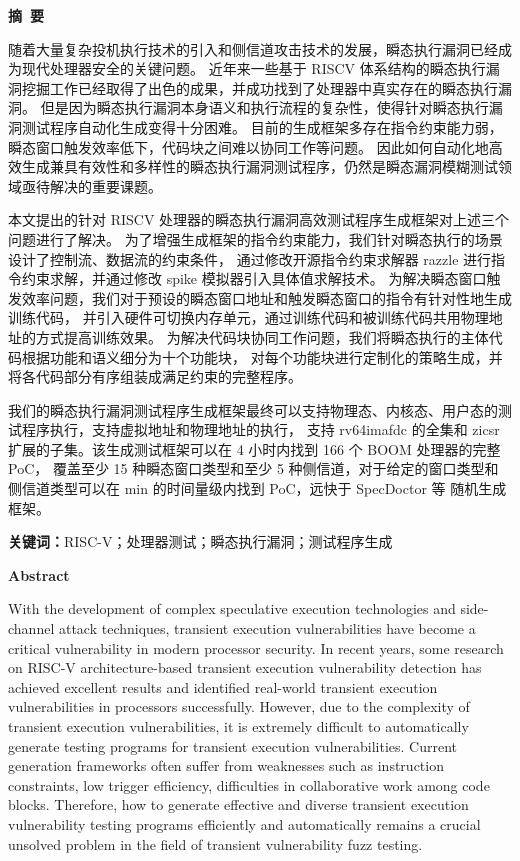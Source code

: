 \cleardoublepage{}
\begin{center}
    \bfseries {} 摘~要
\end{center}

随着大量复杂投机执行技术的引入和侧信道攻击技术的发展，瞬态执行漏洞已经成为现代处理器安全的关键问题。
近年来一些基于 RISCV 体系结构的瞬态执行漏洞挖掘工作已经取得了出色的成果，并成功找到了处理器中真实存在的瞬态执行漏洞。
但是因为瞬态执行漏洞本身语义和执行流程的复杂性，使得针对瞬态执行漏洞测试程序自动化生成变得十分困难。
目前的生成框架多存在指令约束能力弱，瞬态窗口触发效率低下，代码块之间难以协同工作等问题。
因此如何自动化地高效生成兼具有效性和多样性的瞬态执行漏洞测试程序，仍然是瞬态漏洞模糊测试领域亟待解决的重要课题。\par

本文提出的针对 RISCV 处理器的瞬态执行漏洞高效测试程序生成框架对上述三个问题进行了解决。
为了增强生成框架的指令约束能力，我们针对瞬态执行的场景设计了控制流、数据流的约束条件，
通过修改开源指令约束求解器 razzle 进行指令约束求解，并通过修改 spike 模拟器引入具体值求解技术。
为解决瞬态窗口触发效率问题，我们对于预设的瞬态窗口地址和触发瞬态窗口的指令有针对性地生成训练代码，
并引入硬件可切换内存单元，通过训练代码和被训练代码共用物理地址的方式提高训练效果。
为解决代码块协同工作问题，我们将瞬态执行的主体代码根据功能和语义细分为十个功能块，
对每个功能块进行定制化的策略生成，并将各代码部分有序组装成满足约束的完整程序。\par

我们的瞬态执行漏洞测试程序生成框架最终可以支持物理态、内核态、用户态的测试程序执行，支持虚拟地址和物理地址的执行，
支持 rv64imafdc 的全集和 zicsr 扩展的子集。该生成测试框架可以在 4 小时内找到 166 个 BOOM 处理器的完整 PoC，
覆盖至少 15 种瞬态窗口类型和至少 5 种侧信道，对于给定的窗口类型和侧信道类型可以在 min 的时间量级内找到 PoC，远快于 SpecDoctor 等
随机生成框架。\par

\textbf{关键词：}RISC-V；处理器测试；瞬态执行漏洞；测试程序生成

\cleardoublepage{}
\begin{center}
    \bfseries {} Abstract
\end{center}

With the development of complex speculative execution technologies 
and side-channel attack techniques, transient execution vulnerabilities have become a critical vulnerability
in modern processor security. In recent years, 
some research on RISC-V architecture-based transient execution vulnerability detection 
has achieved excellent results and identified real-world transient execution vulnerabilities in processors successfully.
However, due to the complexity of transient execution vulnerabilities, 
it is extremely difficult to automatically generate testing programs for transient execution vulnerabilities.
Current generation frameworks often suffer from weaknesses 
such as instruction constraints, 
low trigger efficiency, difficulties in collaborative work among code blocks. 
Therefore, how to generate effective and diverse transient execution vulnerability testing programs  efficiently and automatically 
remains a crucial unsolved problem in the field of transient vulnerability fuzz testing.\par

